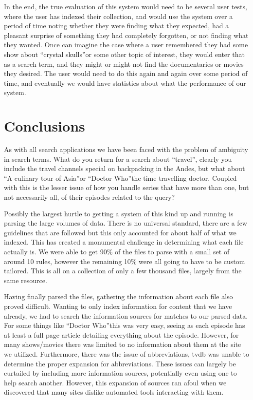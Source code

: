 \documentclass{acm_proc_article-sp}
\begin{document}
In the end, the true evaluation of this system would need to be several user tests, where the user has indexed their collection, and would use the system over a period of time noting whether they were finding what they expected, had a pleasant surprise of something they had completely forgotten, or not finding what they wanted.  Once can imagine the case where a user remembered they had some show about \textquotedblleft crystal skulls\textquotedblright or some other topic of interest, they would enter that as a search term, and they might or might not find the documentaries or movies they desired.  The user would need to do this again and again over some period of time, and eventually we would have statistics about what the performance of our system.


\section{Conclusions}
    As with all search applications we have been faced with the problem of ambiguity in search terms. What do you return for a search about \textquotedblleft travel\textquotedblright, clearly you include the travel channels special on backpacking in the Andes, but what about \textquotedblleft A culinary tour of Asia\textquotedblright or \textquotedblleft Doctor Who\textquotedblright the time travelling doctor. Coupled with this is the lesser issue of how you handle series that have more than one, but not necessarily all, of their episodes related to the query?

    Possibly the largest hurtle to getting a system of this kind up and running is parsing the large volumes of data. There is no universal standard, there are a few guidelines that are followed but this only accounted for about half of what we indexed. This has created a monumental challenge in determining what each file actually is. We were able to get 90\% of the files to parse with a small set of around 10 rules, however the remaining 10\% were all going to have to be custom tailored. This is all on a collection of only a few thousand files, largely from the same resource.

    Having finally parsed the files, gathering the information about each file also proved difficult. Wanting to only index information for content that we have already, we had to search the information sources for matches to our parsed data. For some things like \textquotedblleft Doctor Who\textquotedblright this was very easy, seeing as each episode has at least a full page article detailing everything about the episode. However, for many shows/movies there was limited to no information about them at the site we utilized. Furthermore, there was the issue of abbreviations, tvdb was unable to determine the proper expansion for abbreviations. These issues can largely be curtailed by including more information sources, potentially even using one to help search another. However, this expansion of sources ran afoul when we discovered that many sites dislike automated tools interacting with them.
\end{document}

